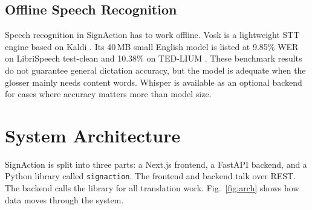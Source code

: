\documentclass[conference]{IEEEtran}
\begin{document}
\subsection{Offline Speech Recognition}

Speech recognition in SignAction has to work offline. Vosk \cite{vosk2021} is a lightweight STT engine based on Kaldi \cite{povey2011}. Its 40\,MB small English model is listed at 9.85\% WER on LibriSpeech test-clean and 10.38\% on TED-LIUM \cite{vosk2021}. These benchmark results do not guarantee general dictation accuracy, but the model is adequate when the glosser mainly needs content words. Whisper \cite{radford2023} is available as an optional backend for cases where accuracy matters more than model size.

\section{System Architecture}
\label{sec:arch}

SignAction is split into three parts: a Next.js frontend, a FastAPI backend, and a Python library called \texttt{signaction}. The frontend and backend talk over REST. The backend calls the library for all translation work. Fig.~\ref{fig:arch} shows how data moves through the system.
\end{document}
